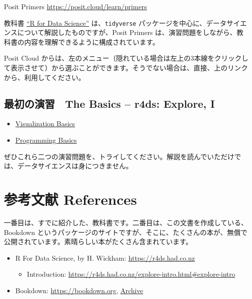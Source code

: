 \documentclass[
  xelatex, ja=standard]{bxjsbook}
\providecommand{\tightlist}{%
  \setlength{\itemsep}{0pt}\setlength{\parskip}{0pt}}
\theoremstyle{definition}
\theoremstyle{definition}
\theoremstyle{definition}
\theoremstyle{definition}
\theoremstyle{remark}
\begin{document}
Posit Primers \url{https://posit.cloud/learn/primers}

教科書 \href{https://r4ds.had.co.nz}{``R for Data Science''} は、\texttt{tidyverse} パッケージを中心に、データサイエンスについて解説したものですが、Posit Primers は、演習問題をしながら、教科書の内容を理解できるように構成されています。

Posit Cloud からは、左のメニュー（隠れている場合は左上の3本線をクリックして表示させて）から選ぶことができます。そうでない場合は、直接、上のリンクから、利用してください。

\hypertarget{ux6700ux521dux306eux6f14ux7fd2-the-basics-r4ds-explore-i}{%
\subsection{最初の演習　The Basics -- r4ds: Explore, I}\label{ux6700ux521dux306eux6f14ux7fd2-the-basics-r4ds-explore-i}}

\begin{itemize}
\tightlist
\item
  \href{https://rstudio.cloud/learn/primers/1.1}{Visualization Basics}
\item
  \href{https://rstudio.cloud/learn/primers/1.2}{Programming Basics}
\end{itemize}

ぜひこれら二つの演習問題を、トライしてください。解説を読んでいただけでは、データサイエンスは身につきません。

\hypertarget{ux53c2ux8003ux6587ux732e-references}{%
\section{参考文献 References}\label{ux53c2ux8003ux6587ux732e-references}}

一番目は、すでに紹介した、教科書です。二番目は、この文書を作成している、Bookdown というパッケージのサイトですが、そこに、たくさんの本が、無償で公開されています。素晴らしい本がたくさん含まれています。

\begin{itemize}
\tightlist
\item
  R For Data Science, by H. Wickham: \url{https://r4ds.had.co.nz}

  \begin{itemize}
  \tightlist
  \item
    Introduction: \url{https://r4ds.had.co.nz/explore-intro.html\#explore-intro}
  \end{itemize}
\item
  Bookdown: \url{https://bookdown.org}, \href{https://bookdown.org/home/archive/}{Archive}
\end{itemize}
\end{document}
